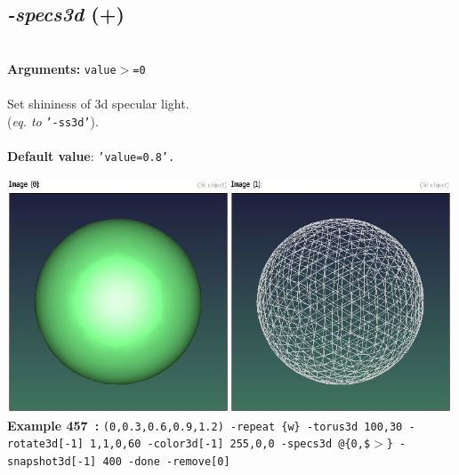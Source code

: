 \documentclass[a4paper,11pt,twoside]{book}
\begin{document}
\subsection{\emph{-specs3d} (+)}\vspace*{-0.5em}
~\\\textbf{Arguments: } 
{\small \texttt{value$>$=0}}\\~\\
Set shininess of 3d specular light.
~\\(\emph{eq. to} {\small \texttt{'-ss3d'}}).
~\\~\\\textbf{Default value}: {\small \texttt{'value=0.8'.}}
\begin{center}\includegraphics[keepaspectratio=true,height=7cm,width=\textwidth]{img/gmic_def457.jpg}\\
{\footnotesize \textbf{Example 457~:} \texttt{(0,0.3,0.6,0.9,1.2) -repeat \{w\} -torus3d 100,30 -rotate3d[-1] 1,1,0,60 -color3d[-1] 255,0,0 -specs3d @\{0,\$$>$\} -snapshot3d[-1] 400 -done -remove[0]}}
\end{center}
\end{document}
